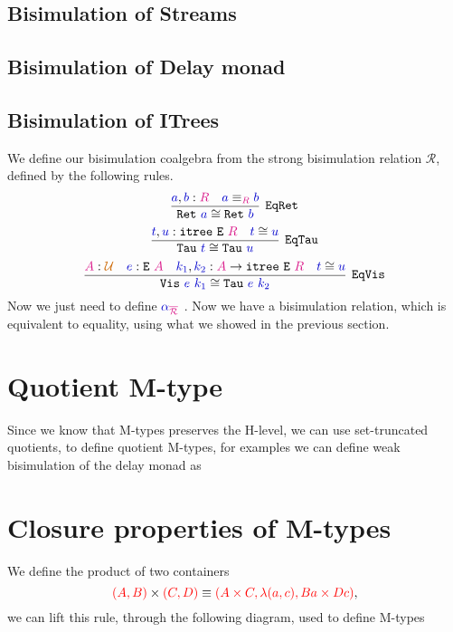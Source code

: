 \documentclass[twoside,11pt,openright]{report}
\newcommand*{\term}[1]{\textcolor{blue!80!black}{#1}}
\newcommand*{\type}[1]{\textcolor{magenta!90!black}{#1}}
\newcommand*{\container}[1]{\textcolor{red}{#1}}
\newcommand*{\universe}[1]{\textcolor{orange!80!black}{#1}}
\newcommand*{\typeformer}[1]{\mathtt{#1}}
\begin{document}
\subsection{Bisimulation of Streams}
\subsection{Bisimulation of Delay monad}
\subsection{Bisimulation of ITrees}
We define our bisimulation coalgebra from the strong bisimulation relation \(\mathcal{R}\), defined by the following rules.
\begin{equation}
  \infer[\mathtt{EqRet}]{\mathtt{Ret}~\term{a} \cong \mathtt{Ret}~\term{b}}{\term{a},\term{b} : \type{R} & \term{a} \equiv_{\type{R}} \term{b}}
\end{equation}
\begin{equation}
  \infer[\mathtt{EqTau}]{\mathtt{Tau}~\term{t} \cong \mathtt{Tau}~\term{u}}{\term{t},\term{u} : \mathtt{itree}~\typeformer{E}~\type{R} & \term{t} \cong \term{u}}
\end{equation}
\begin{equation}
  \infer[\mathtt{EqVis}]{\mathtt{Vis}~\term{e}~\term{k_1} \cong \mathtt{Tau}~\term{e}~\term{k_2}}{\type{A} : \universe{\mathcal{U}} & \term{e} : \typeformer{E}~\type{A} & \term{k_1},\term{k_2} : \type{A} \rightarrow \mathtt{itree}~\typeformer{E}~\type{R} & \term{t} \cong \term{u}}
\end{equation}
Now we just need to define \(\term{\alpha}_{\type{\overline{\mathcal{R}}}}\) . Now we have a bisimulation relation, which is equivalent to equality, using what we showed in the previous section.

\section{Quotient M-type}
Since we know that M-types preserves the H-level, we can use set-truncated quotients, to define quotient M-types, for examples we can define weak bisimulation of the delay monad as
\[\]

\section{Closure properties of M-types}
We define the product of two containers
\begin{equation}
  \container{(A,B)} \times \container{(C,D)} \equiv \container{( A \times C , \lambda (a , c), B a \times D c)},
\end{equation}
we can lift this rule, through the following diagram, used to define M-types
\end{document}

